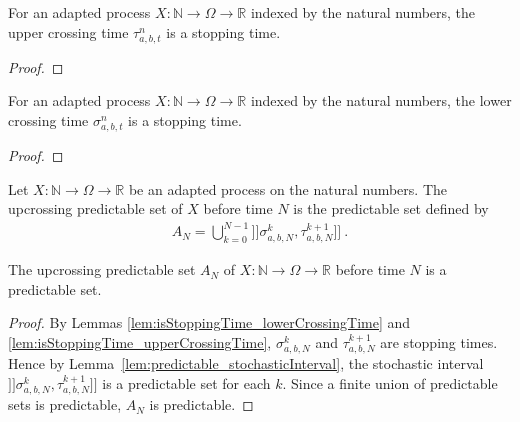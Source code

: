 \begin{lemma}\label{lem:isStoppingTime_upperCrossingTime}
For an adapted process $X : \mathbb{N} \to \Omega \to \mathbb{R}$ indexed by the natural numbers, the upper crossing time $\tau^n_{a, b, t}$ is a stopping time.
\end{lemma}

\begin{proof}

\end{proof}


\begin{lemma}\label{lem:isStoppingTime_lowerCrossingTime}
For an adapted process $X : \mathbb{N} \to \Omega \to \mathbb{R}$ indexed by the natural numbers, the lower crossing time $\sigma^n_{a, b, t}$ is a stopping time.
\end{lemma}

\begin{proof}

\end{proof}


\begin{definition}\label{def:upcrossingPredictableSet}
Let $X : \mathbb{N} \to \Omega \to \mathbb{R}$ be an adapted process on the natural numbers.
The upcrossing predictable set of $X$ before time $N$ is the predictable set defined by
\begin{align*}
  A_N = \bigcup_{k=0}^{N-1} ]\!]\sigma^k_{a, b, N}, \tau^{k+1}_{a, b, N}]\!]
  \:.
\end{align*}
\end{definition}


\begin{lemma}\label{lem:predictable_upcrossingPredictableSet}
The upcrossing predictable set $A_N$ of $X : \mathbb{N} \to \Omega \to \mathbb{R}$ before time $N$ is a predictable set.
\end{lemma}

\begin{proof}
By Lemmas \ref{lem:isStoppingTime_lowerCrossingTime} and \ref{lem:isStoppingTime_upperCrossingTime}, $\sigma^k_{a, b, N}$ and $\tau^{k+1}_{a, b, N}$ are stopping times.
Hence by Lemma~\ref{lem:predictable_stochasticInterval}, the stochastic interval $]\!]\sigma^k_{a, b, N}, \tau^{k+1}_{a, b, N}]\!]$ is a predictable set for each $k$.
Since a finite union of predictable sets is predictable, $A_N$ is predictable.
\end{proof}

